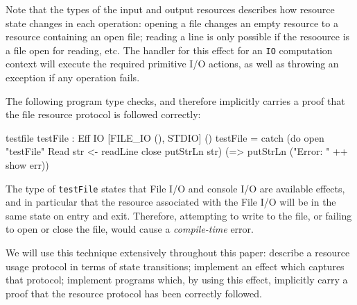 \noindent
Note that the types of the input and output resources describes how resource
state changes in each operation: opening a file changes an empty resource to
a resource containing an open file; reading a line is only possible if the
resoource is a file open for reading, etc.
The handler for this effect for an \texttt{IO} computation context will
execute the required primitive I/O actions, as well as throwing an exception
if any operation fails.

The following program type checks, and therefore implicitly carries 
a proof that the file resource protocol is followed correctly:

\begin{SaveVerbatim}{testfile}
testFile : Eff IO [FILE_IO (), STDIO] () 
testFile = catch (do open "testFile" Read
                     str <- readLine
                     close
                     putStrLn str)
                 (\err => putStrLn ("Error: " ++ show err))
\end{SaveVerbatim}

\noindent
The type of \texttt{testFile} states
that File I/O and console I/O are available effects, and in particular that
the resource associated with the File I/O will be in the same state on entry
and exit.
Therefore, attempting to write to the file, or failing to open or close the
file, would cause a \emph{compile-time} error. 

We will use this technique extensively
throughout this paper: describe a resource usage protocol in terms of
state transitions; implement an effect which captures that protocol; implement
programs which, by using this effect, implicitly carry a proof that the resource
protocol has been correctly followed.



